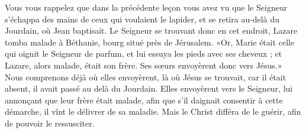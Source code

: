 Vous vous rappelez que dans la précédente leçon
	vous avez vu que le Seigneur
		s’échappa des mains de ceux qui voulaient le lapider,
	et se retira au-delà du Jourdain, où Jean baptisait.
Le Seigneur se trouvant donc en cet endroit,
	Lazare tomba malade à Béthanie,
	bourg situé près de Jérusalem.
«Or, Marie était celle qui oignit le Seigneur de parfum,
	et lui essuya les pieds avec ses cheveux ;
	et Lazare, alors malade, était son frère.
	Ses sœurs envoyèrent donc vers Jésus.»
Nous comprenons déjà où elles envoyèrent, là où Jésus se trouvait,
	car il était absent, il avait passé au delà du Jourdain.
Elles envoyèrent vers le Seigneur, lui annonçant que leur frère était malade,
	afin que s’il daignait consentir à cette démarche,
	il vînt le délivrer de sa maladie.
Mais le Christ différa de le guérir, afin de pouvoir le ressusciter.
